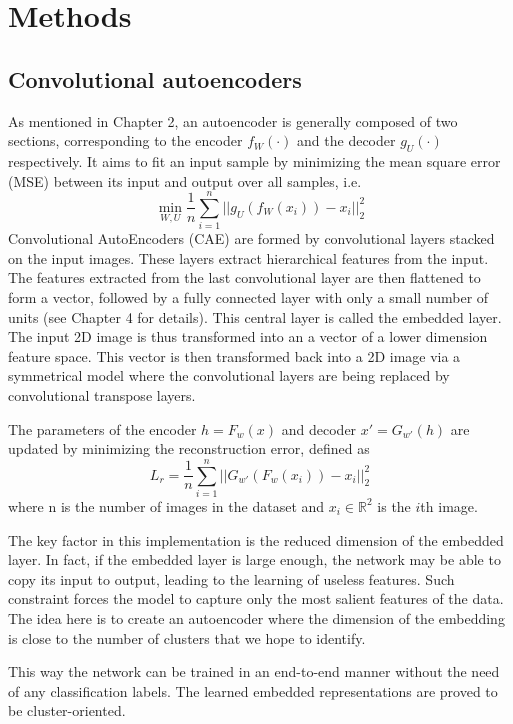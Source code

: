 \chapter{Methods}

\section{Convolutional autoencoders}

As mentioned in Chapter 2, an autoencoder is generally composed of two sections, corresponding to the encoder $f_W(\cdot)$ and the decoder $g_U(\cdot)$ respectively. It aims to fit an input sample by minimizing the mean square error (MSE) between its input and output over all samples, i.e.
\begin{equation}
    \min_{W, U} \frac{1}{n} \sum_{i=1}^n ||g_U (f_W(x_i))-x_i||_2^2
\end{equation}
Convolutional AutoEncoders (CAE) are formed by convolutional layers stacked on the input images. These layers extract hierarchical features from the input. The features extracted from the last convolutional layer are then flattened to form a vector, followed by a fully connected layer with only a small number of units (see Chapter 4 for details). This central layer is called the embedded layer. The input 2D image is thus transformed into an a vector of a lower dimension feature space. This vector is then transformed back into a 2D image via a symmetrical model where the convolutional layers are being replaced by convolutional transpose layers. 

The parameters of the encoder $h = F_w(x)$ and decoder $x' = G_{w'}(h)$ are updated by minimizing the reconstruction error, defined as
\begin{equation}
    L_r = \frac{1}{n} \sum_{i=1}^n ||G_{w'} (F_w(x_i))-x_i||_2^2
    \label{L_r}
\end{equation}
where n is the number of images in the dataset and $x_i \in \mathbb{R}^2$ is the $i$th image.

The key factor in this implementation is the reduced dimension of the embedded layer. In fact, if the embedded layer is large enough, the network may be able to copy its input to output, leading to the learning of useless features. Such constraint forces the model to capture only the most salient features of the data. The idea here is to create an autoencoder where the dimension of the embedding is close to the number of clusters that we hope to identify.

This way the network can be trained in an end-to-end manner without the need of any classification labels. The learned embedded representations are proved to be cluster-oriented.

